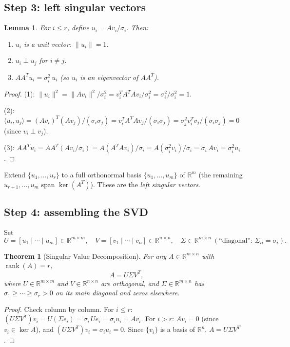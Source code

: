 \documentclass[11pt]{article}
\theoremstyle{definition}
\theoremstyle{plain}
\newtheorem{theorem}{Theorem}[section]
\newtheorem{lemma}{Lemma}[section]
\begin{document}
\subsection{Step 3: left singular vectors}

\begin{lemma}
  For $i \le r$, define $u_i = Av_i / \sigma_i$.  Then:
  \begin{enumerate}
    \item $u_i$ is a unit vector: $\|u_i\| = 1$.
    \item $u_i \perp u_j$ for $i \ne j$.
    \item $AA^T u_i = \sigma_i^2\, u_i$ (so $u_i$ is an eigenvector of $AA^T$).
  \end{enumerate}
\end{lemma}
\begin{proof}
  (1): $\|u_i\|^2 = \|Av_i\|^2/\sigma_i^2 = v_i^T A^TAv_i/\sigma_i^2
  = \sigma_i^2/\sigma_i^2 = 1$.

  (2): $\langle u_i, u_j\rangle = (Av_i)^T(Av_j)/(\sigma_i\sigma_j)
  = v_i^T A^T A v_j / (\sigma_i\sigma_j)
  = \sigma_j^2 v_i^T v_j / (\sigma_i\sigma_j) = 0$ (since $v_i\perp v_j$).

  (3): $AA^T u_i = AA^T(Av_i/\sigma_i) = A(A^TAv_i)/\sigma_i
  = A(\sigma_i^2 v_i)/\sigma_i = \sigma_i\, Av_i = \sigma_i^2 u_i$.
\end{proof}

Extend $\{u_1,\ldots,u_r\}$ to a full orthonormal basis $\{u_1,\ldots,u_m\}$
of $\mathbb{R}^m$ (the remaining $u_{r+1},\ldots,u_m$ span $\ker(A^T)$).
These are the \emph{left singular vectors}.

\subsection{Step 4: assembling the SVD}

Set
\[
  U = [u_1\mid\cdots\mid u_m]\in\mathbb{R}^{m\times m}, \quad
  V = [v_1\mid\cdots\mid v_n]\in\mathbb{R}^{n\times n}, \quad
  \Sigma\in\mathbb{R}^{m\times n}\ (\text{``diagonal'': }\Sigma_{ii}=\sigma_i).
\]

\begin{theorem}[Singular Value Decomposition]\label{thm:svd}
  For any $A\in\mathbb{R}^{m\times n}$ with $\operatorname{rank}(A)=r$,
  \[
    A = U\Sigma V^T,
  \]
  where $U\in\mathbb{R}^{m\times m}$ and $V\in\mathbb{R}^{n\times n}$ are
  orthogonal, and $\Sigma\in\mathbb{R}^{m\times n}$ has
  $\sigma_1\ge\cdots\ge\sigma_r>0$ on its main diagonal and zeros elsewhere.
\end{theorem}
\begin{proof}
  Check column by column.  For $i \le r$:
  $(U\Sigma V^T)v_i = U(\Sigma e_i) = \sigma_i\,U e_i = \sigma_i u_i = Av_i$.
  For $i > r$: $Av_i = 0$ (since $v_i\in\ker A$), and
  $(U\Sigma V^T)v_i = \sigma_i u_i = 0$.
  Since $\{v_i\}$ is a basis of $\mathbb{R}^n$, $A = U\Sigma V^T$.
\end{proof}
\end{document}
